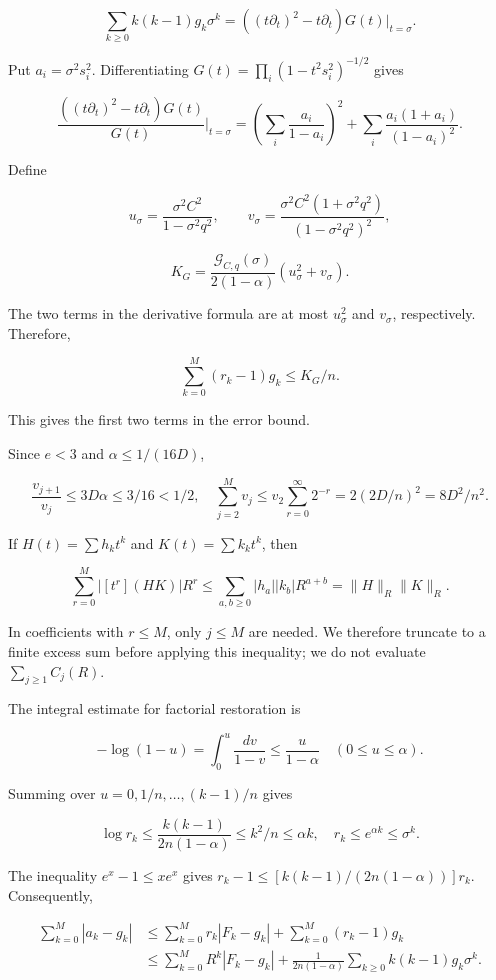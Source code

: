\documentclass[11pt,a4paper]{article}
\begin{document}
\[
\sum_{k\ge0}k(k-1)g_k\sigma^k
=\left((t\partial_t)^2-t\partial_t\right)G(t)\big|_{t=\sigma}.
\]

Put \(a_i=\sigma^2s_i^2\). Differentiating \(G(t)=\prod_i(1-t^2s_i^2)^{-1/2}\) gives

\[
\frac{\left((t\partial_t)^2-t\partial_t\right)G(t)}{G(t)}
\bigg|_{t=\sigma}
=\left(\sum_i\frac{a_i}{1-a_i}\right)^2
+\sum_i\frac{a_i(1+a_i)}{(1-a_i)^2}.
\]

Define

\[
u_\sigma=\frac{\sigma^2C^2}{1-\sigma^2q^2},
\qquad
v_\sigma=\frac{\sigma^2C^2(1+\sigma^2q^2)}
{(1-\sigma^2q^2)^2},
\]

\[
K_G=\frac{\mathcal G_{C,q}(\sigma)}{2(1-\alpha)}
\left(u_\sigma^2+v_\sigma\right).
\]

The two terms in the derivative formula are at most \(u_\sigma^2\) and \(v_\sigma\), respectively. Therefore,

\[
\sum_{k=0}^{M}(r_k-1)g_k\le K_G/n.
\]

This gives the first two terms in the error bound.

Since \(e<3\) and \(\alpha\le1/(16D)\),

\[
\frac{v_{j+1}}{v_j}\le3D\alpha\le3/16<1/2,
\quad
\sum_{j=2}^Mv_j\le v_2\sum_{r=0}^{\infty}2^{-r}
=2(2D/n)^2=8D^2/n^2.
\]

If \(H(t)=\sum h_kt^k\) and \(K(t)=\sum k_kt^k\), then

\[
\sum_{r=0}^M|[t^r](HK)|R^r
\le\sum_{a,b\ge0}|h_a||k_b|R^{a+b}
=\|H\|_R\|K\|_R.
\]

In coefficients with \(r\le M\), only \(j\le M\) are needed. We therefore truncate to a finite excess sum before applying this inequality; we do not evaluate \(\sum_{j\ge1}C_j(R)\).

The integral estimate for factorial restoration is

\[
-\log(1-u)=\int_0^u\frac{dv}{1-v}\le\frac{u}{1-\alpha}
\quad(0\le u\le\alpha).
\]

Summing over \(u=0,1/n,\ldots,(k-1)/n\) gives

\[
\log r_k\le\frac{k(k-1)}{2n(1-\alpha)}\le k^2/n\le\alpha k,
\quad r_k\le e^{\alpha k}\le\sigma^k.
\]

The inequality \(e^x-1\le xe^x\) gives \(r_k-1\le[k(k-1)/(2n(1-\alpha))]r_k\). Consequently,

\[
\begin{aligned}
\sum_{k=0}^M|a_k-g_k|
&\le\sum_{k=0}^Mr_k|F_k-g_k|+\sum_{k=0}^M(r_k-1)g_k\\
&\le\sum_{k=0}^MR^k|F_k-g_k|
+\frac1{2n(1-\alpha)}\sum_{k\ge0}k(k-1)g_k\sigma^k.
\end{aligned}
\]
\end{document}
